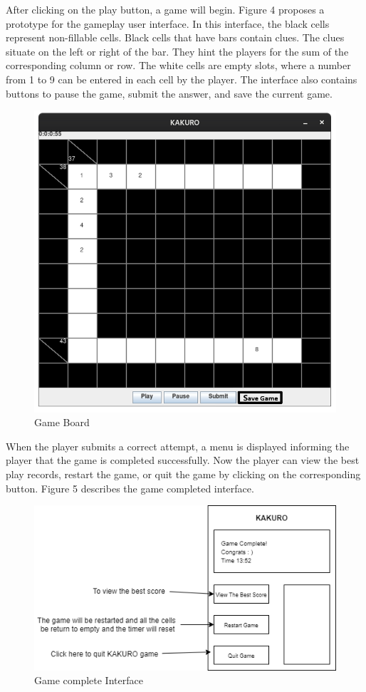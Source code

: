 \documentclass[12pt]{article}
\begin{document}
\newpage
After clicking on the play button, a game will begin. Figure 4 proposes a prototype for the gameplay user interface. In this interface, the black cells represent non-fillable cells. Black cells that have bars contain clues. The clues situate on the left or right of the bar. They hint the players for the sum of the corresponding column or row. The white cells are empty slots, where a number from 1 to 9 can be entered in each cell by the player. The interface also contains buttons to pause the game, submit the answer, and save the current game. 

\begin{figure}[htbp]
    \centering
    \includegraphics[scale=0.5]{UI-0.png}
    \caption{Game Board}
    \label{fig:UI-0}
\end{figure}

\newpage
When the player submits a correct attempt, a menu is displayed informing the player that the game is completed successfully. Now the player can view the best play records, restart the game, or quit the game by clicking on the corresponding button. Figure 5 describes the game completed interface.   

\begin{figure}[htbp]
    \centering
    \includegraphics[scale=0.8]{UI-2.png}
    \caption{Game complete Interface}
    \label{fig:UI-2}
\end{figure}
\end{document}
